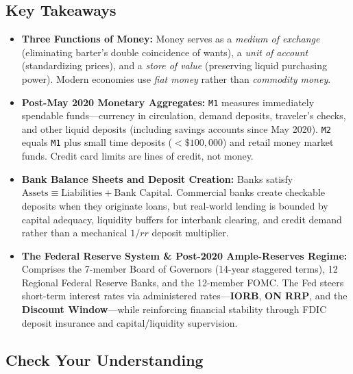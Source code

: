 \documentclass[11pt, oneside]{book}
\begin{document}
\subsection*{Key Takeaways}
\begin{itemize}[leftmargin=1.5em, itemsep=3pt]
  \item \textbf{Three Functions of Money:} Money serves as a \emph{medium of exchange} (eliminating barter's double coincidence of wants), a \emph{unit of account} (standardizing prices), and a \emph{store of value} (preserving liquid purchasing power). Modern economies use \emph{fiat money} rather than \emph{commodity money}.
  \item \textbf{Post-May 2020 Monetary Aggregates:} \texttt{M1} measures immediately spendable funds—currency in circulation, demand deposits, traveler's checks, and other liquid deposits (including savings accounts since May 2020). \texttt{M2} equals \texttt{M1} plus small time deposits ($<\$100{,}000$) and retail money market funds. Credit card limits are lines of credit, not money.
  \item \textbf{Bank Balance Sheets and Deposit Creation:} Banks satisfy $\text{Assets} \equiv \text{Liabilities} + \text{Bank Capital}$. Commercial banks create checkable deposits when they originate loans, but real-world lending is bounded by capital adequacy, liquidity buffers for interbank clearing, and credit demand rather than a mechanical $1/rr$ deposit multiplier.
  \item \textbf{The Federal Reserve System \& Post-2020 Ample-Reserves Regime:} Comprises the 7-member Board of Governors (14-year staggered terms), 12 Regional Federal Reserve Banks, and the 12-member FOMC. The Fed steers short-term interest rates via administered rates---\textbf{IORB}, \textbf{ON RRP}, and the \textbf{Discount Window}---while reinforcing financial stability through FDIC deposit insurance and capital/liquidity supervision.
\end{itemize}

\subsection*{Check Your Understanding}
\end{document}
